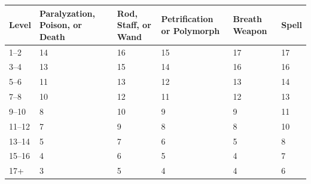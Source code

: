 \noindent
\begin{minipage}{\columnwidth}

\label{warriorsaves}
\noindent
\begin{tabular}{|m{}|m{}|m{}|m{}|m{}|m{}|}
\hline
Level	& Paralyzation, Poison, or Death	& Rod, Staff, or Wand	& Petrification or Polymorph	& Breath Weapon	& Spell \\
\hline\hline
\rowcolor[gray]{.9}1--2		& 14	& 16	& 15	& 17	& 17 \\
3--4		& 13	& 15	& 14	& 16	& 16 \\
\rowcolor[gray]{.9}5--6		& 11	& 13	& 12	& 13	& 14 \\
7--8		& 10	& 12	& 11	& 12	& 13 \\
\rowcolor[gray]{.9}9--10	& 8		& 10	& 9		& 9		& 11 \\
11--12	& 7		& 9		& 8		& 8		& 10 \\
\rowcolor[gray]{.9}13--14	& 5		& 7		& 6		& 5		& 8 \\
15--16	& 4		& 6		& 5		& 4		& 7 \\
\rowcolor[gray]{.9}17+		& 3		& 5		& 4		& 4		& 6 \\
\hline
\end{tabular}

\end{minipage}

